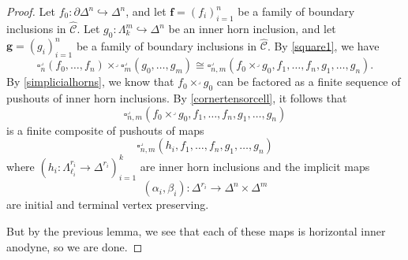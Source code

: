 \documentclass[a4paper]{article}
\numberwithin{equation}{subsection}
\theoremstyle{plain}   %
\theoremstyle{definition}
\theoremstyle{remark}
\theoremstyle{plain}
\newcommand{\psh}[1]{\ensuremath{\widehat{#1}}}
\providecommand{\C}{}
\renewcommand{\C}{\ensuremath{\mathcal{C}}}
\begin{document}
\begin{proof}
	Let \(f_0:\partial\Delta^n \hookrightarrow \Delta^n\), and let \(\mathbf{f}=(f_i)_{i=1}^n\) be a family of boundary inclusions in \(\psh{\C}\).  Let \(g_0:\Lambda^m_k \hookrightarrow \Delta^n\) be an inner horn inclusion, and let \(\mathbf{g}=(g_i)_{i=1}^n\) be a family of boundary inclusions in \(\psh{\C}\).  By \ref{square1}, we have 
	\[
		\square^\lrcorner_n(f_0,\dots,f_n) \times^\lrcorner \square^\lrcorner_m(g_0,\dots,g_m) \cong \square^\lrcorner_{n,m}(f_0 \times^\lrcorner g_0, f_1,\dots,f_n,g_1,\dots,g_n).
	\]
	By \ref{simplicialhorns}, we know that \(f_0\times^\lrcorner g_0\) can be factored as a finite sequence of pushouts of inner horn inclusions.  By \ref{cornertensorcell}, it follows that
	\[
		\square^\lrcorner_{n,m}(f_0 \times^\lrcorner g_0, f_1,\dots,f_n,g_1,\dots,g_n)
	\]
	is a finite composite of pushouts of maps
	\[
		\square^\lrcorner_{n,m}(h_i, f_1,\dots,f_n,g_1,\dots,g_n)
	\] 
	where \((h_i:\Lambda^{r_i}_{\ell_i} \to \Delta^{r_i})_{i=1}^k\) are inner horn inclusions and the implicit maps 
	\[
		(\alpha_i,\beta_i):\Delta^{r_i}\to \Delta^n\times \Delta^m
	\]
	are initial and terminal vertex preserving. 

	But by the previous lemma, we see that each of these maps is horizontal inner anodyne, so we are done.
\end{proof}
\end{document}
